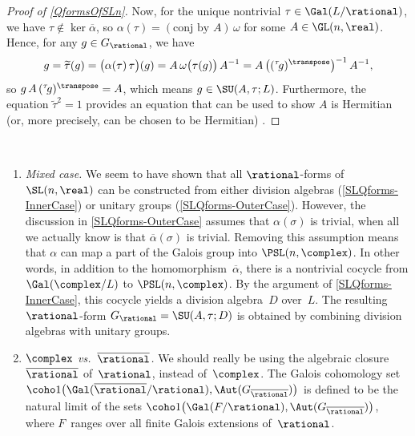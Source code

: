 \begin{proof}[Proof of \cref{QformsOfSLn}]
Now, for the unique nontrivial $\tau \in \Gal(L/\rational)$, we have $\tau \notin \ker \overline\alpha$, so $\alpha(\tau) = (\text{conj~by~$A$}) \, \omega$ for some $A \in \GL(n,\real)$. Hence,  for any $g \in G_\rational$, we have
	$$g = \widetilde\tau(g) 
	=  \bigl( \alpha(\tau) \, \tau \bigr) (g) 
	= A \, \omega \bigl( \tau(g) \bigr) \, A^{-1}
	= A \, \bigl( ({}^{\tau} \! g)^\transpose \bigr) ^{-1} \, A^{-1} ,$$
so $g \, A \, ({}^{\tau} \! g)^\transpose = A$, which means $g \in \SU( A, \tau;  L)$. Furthermore, the equation $\widetilde\tau^2 = 1$ provides an equation that can be used to show $A$ is Hermitian (or, more precisely, can be chosen to be Hermitian) .
\end{proof}


\begin{corrections} \label{QFormCorrections} \ 
\noprelistbreak
\begin{enumerate}
\item \label{QFormCorrections-mixed} 
\emph{Mixed case.}
We seem to have shown that all $\rational$-forms of $\SL(n,\real)$ can be constructed from either division algebras (\cref{SLQforms-InnerCase}) or unitary groups (\cref{SLQforms-OuterCase}). However, the discussion in \cref{SLQforms-OuterCase} assumes that $\alpha(\sigma)$ is trivial, when all we actually know is that $\overline\alpha(\sigma)$ is trivial. Removing this assumption means that $\alpha$ can map a part of the Galois group into $\PSL(n,\complex)$. In other words, in addition to the homomorphism~$\overline\alpha$, there is a nontrivial cocycle from $\Gal(\complex/L)$  to $\PSL(n,\complex)$. By the argument of \cref{SLQforms-InnerCase}, this cocycle yields a division algebra~$D$ over~$L$. The resulting $\rational$-form	
	$ G_\rational = \SU( A, \tau ; D)$
is obtained by combining division algebras with unitary groups.


\item \label{QFormCorrections-Qbar} 
\emph{$\complex$ vs.\ $\overline{\rational}$.} We should really be using the algebraic closure~$\overline{\rational}$ of~$\rational$, instead of~$\complex$. The Galois cohomology set $\coho1 \bigl( \Gal ( \overline\rational /\rational ), \Aut(G_{\overline\rational}) \bigr)$ is defined to be the natural limit of the sets $\coho1 \bigl( \Gal ( F /\rational ), \Aut(G_{\overline\rational}) \bigr)$, where $F$~ranges over all finite Galois extensions of~$\rational$.


\end{enumerate}
\end{corrections}
